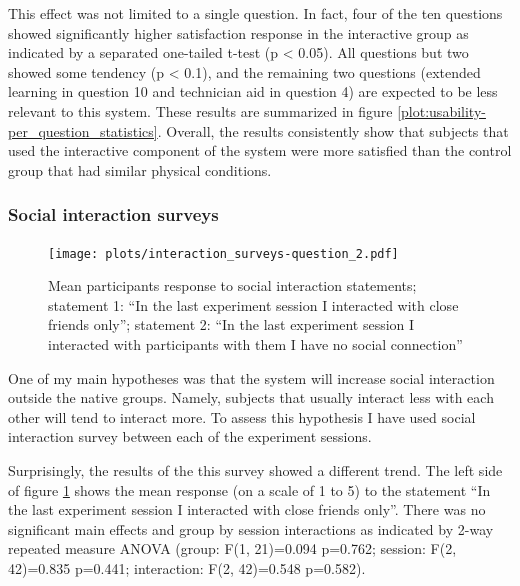 \documentclass[a4paper,11pt]{article}
\begin{document}
{This effect was not limited to a single question.
In fact, four of the ten questions showed significantly higher satisfaction response in the interactive group as indicated by a separated one-tailed t-test (p \textless{} 0.05). All questions but two showed some tendency (p \textless{} 0.1), and the remaining two questions (extended learning in question 10 and technician aid in question 4) are expected to be less relevant to this system.
These results are summarized in figure \ref{plot:usability-per_question_statistics}.
Overall, the results consistently show that subjects that used the interactive component of the system were more satisfied than the control group that had similar physical conditions.

\subsubsection{Social interaction surveys}

\begin{figure}[!htb]
    \centering
    \texttt{[image: plots/interaction\_surveys-question\_2.pdf]}
    \caption{Mean participants response to social interaction statements; statement 1: ``In the last experiment session I interacted with close friends only''; statement 2: ``In the last experiment session I interacted with participants with them I have no social connection''}\label{plot:interaction_surveys-question_2}
\end{figure}

One of my main hypotheses was that the system will increase social interaction outside the native groups.
Namely, subjects that usually interact less with each other will tend to interact more.
To assess this hypothesis I have used social interaction survey between each of the experiment sessions.

Surprisingly, the results of the this survey showed a different trend.
The left side of figure \ref{plot:interaction_surveys-question_2} shows the mean response (on a scale of 1 to 5) to the statement ``In the last experiment session I interacted with close friends only''.
There was no significant main effects and group by session interactions as indicated by 2-way repeated measure ANOVA (group: F(1, 21)=0.094 p=0.762; session: F(2, 42)=0.835 p=0.441; interaction: F(2, 42)=0.548 p=0.582).

}
\end{document}

